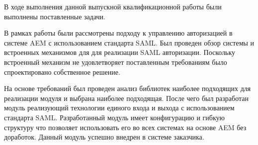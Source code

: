 \Conclusion %

В ходе выполнения данной выпускной квалификационной работы были выполнены поставленные задачи.

В рамках работы были рассмотрены подходу к управлению авторизацией в системе AEM с использованием стандарта SAML. Был проведен обзор системы и встроенных механизмов для для реализации SAML авторизации. Поскольку встроенный механизм не удовлетворяет поставленным требованиям было спроектировано собственное решение.

На основе требований был проведен анализ библиотек наиболее подходящих для реализации модуля и выбрана наиболее подходящая. После чего был разработан модуль реализующий технологии единого входа и выхода с использованием стандарта SAML. Разработанный модуль имеет конфигурацию и гибкую структуру что позволяет использовать его во всех системах на основе AEM без доработок. Данный модуль успешно внедрен в системе заказчика.


